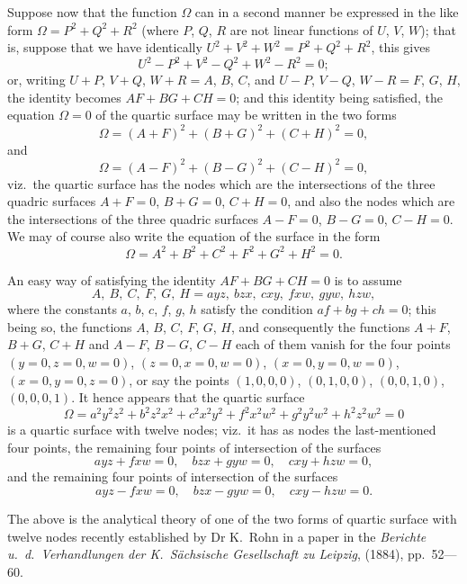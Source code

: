\documentclass[11pt,a4paper]{article}
\begin{document}
Suppose now that the function $\Omega$ can in a second manner be expressed in the like form $\Omega = P^2 + Q^2 + R^2$ (where $P$, $Q$, $R$ are not linear functions of $U$, $V$, $W$); that is, suppose that we have identically $U^2 + V^2 + W^2 = P^2 + Q^2 + R^2$, this gives
\[
U^2 - P^2 + V^2 - Q^2 + W^2 - R^2 = 0;
\]
or, writing $U+P$, $V+Q$, $W+R = A$, $B$, $C$, and $U-P$, $V-Q$, $W-R = F$, $G$, $H$, the identity becomes $AF + BG + CH = 0$; and this identity being satisfied, the equation $\Omega = 0$ of the quartic surface may be written in the two forms
\[
\Omega = (A+F)^2 + (B+G)^2 + (C+H)^2 = 0,
\]
and
\[
\Omega = (A-F)^2 + (B-G)^2 + (C-H)^2 = 0,
\]
viz.\ the quartic surface has the nodes which are the intersections of the three quadric surfaces $A+F=0$, $B+G=0$, $C+H=0$, and also the nodes which are the intersections of the three quadric surfaces $A-F=0$, $B-G=0$, $C-H=0$. We may of course also write the equation of the surface in the form
\[
\Omega = A^2 + B^2 + C^2 + F^2 + G^2 + H^2 = 0.
\]

An easy way of satisfying the identity $AF+BG+CH=0$ is to assume
\[
A,\ B,\ C,\ F,\ G,\ H = ayz,\ bzx,\ cxy,\ fxw,\ gyw,\ hzw,
\]
where the constants $a$, $b$, $c$, $f$, $g$, $h$ satisfy the condition $af + bg + ch = 0$; this being so, the functions $A$, $B$, $C$, $F$, $G$, $H$, and consequently the functions $A+F$, $B+G$, $C+H$ and $A-F$, $B-G$, $C-H$ each of them vanish for the four points $(y=0, z=0, w=0)$, $(z=0, x=0, w=0)$, $(x=0, y=0, w=0)$, $(x=0, y=0, z=0)$, or say the points $(1,0,0,0)$, $(0,1,0,0)$, $(0,0,1,0)$, $(0,0,0,1)$. It hence appears that the quartic surface
\[
\Omega = a^2y^2z^2 + b^2z^2x^2 + c^2x^2y^2 + f^2x^2w^2 + g^2y^2w^2 + h^2z^2w^2 = 0
\]
is a quartic surface with twelve nodes; viz.\ it has as nodes the last-mentioned four points, the remaining four points of intersection of the surfaces
\[
ayz + fxw = 0,\quad bzx + gyw = 0,\quad cxy + hzw = 0,
\]
and the remaining four points of intersection of the surfaces
\[
ayz - fxw = 0,\quad bzx - gyw = 0,\quad cxy - hzw = 0.
\]

The above is the analytical theory of one of the two forms of quartic surface with twelve nodes recently established by Dr K.\ Rohn in a paper in the \emph{Berichte u.\ d.\ Verhandlungen der K.\ S\"achsische Gesellschaft zu Leipzig}, (1884), pp.\ 52---60.


\end{document}
